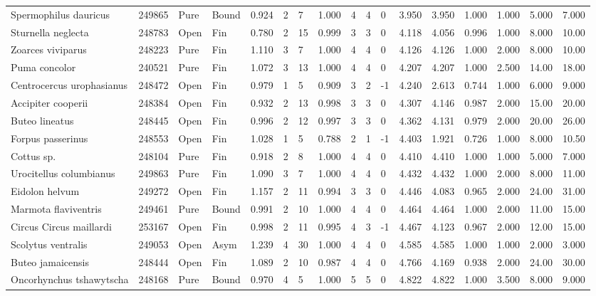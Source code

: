 \documentclass[10pt,a4paper]{amsart}
\theoremstyle{definition}
\theoremstyle{remark}
\numberwithin{equation}{section}
\begin{document}
\begin{table}[ht]
{\begin{tabular}{lllllllllllllllll}
Spermophilus dauricus & 249865 & Pure & Bound & 0.924 & 2 & 7 & 1.000 & 4 & 4 & 0 & 3.950 & 3.950 & 1.000 & 1.000 & 5.000 & 7.000 \\
Sturnella neglecta & 248783 & Open & Fin & 0.780 & 2 & 15 & 0.999 & 3 & 3 & 0 & 4.118 & 4.056 & 0.996 & 1.000 & 8.000 & 10.00 \\
Zoarces viviparus & 248223 & Pure & Fin & 1.110 & 3 & 7 & 1.000 & 4 & 4 & 0 & 4.126 & 4.126 & 1.000 & 2.000 & 8.000 & 10.00 \\
Puma concolor & 240521 & Pure & Fin & 1.072 & 3 & 13 & 1.000 & 4 & 4 & 0 & 4.207 & 4.207 & 1.000 & 2.500 & 14.00 & 18.00 \\
Centrocercus urophasianus & 248472 & Open & Fin & 0.979 & 1 & 5 & 0.909 & 3 & 2 & -1 & 4.240 & 2.613 & 0.744 & 1.000 & 6.000 & 9.000 \\
Accipiter cooperii & 248384 & Open & Fin & 0.932 & 2 & 13 & 0.998 & 3 & 3 & 0 & 4.307 & 4.146 & 0.987 & 2.000 & 15.00 & 20.00 \\
Buteo lineatus & 248445 & Open & Fin & 0.996 & 2 & 12 & 0.997 & 3 & 3 & 0 & 4.362 & 4.131 & 0.979 & 2.000 & 20.00 & 26.00 \\
Forpus passerinus & 248553 & Open & Fin & 1.028 & 1 & 5 & 0.788 & 2 & 1 & -1 & 4.403 & 1.921 & 0.726 & 1.000 & 8.000 & 10.50 \\
Cottus sp. & 248104 & Pure & Fin & 0.918 & 2 & 8 & 1.000 & 4 & 4 & 0 & 4.410 & 4.410 & 1.000 & 1.000 & 5.000 & 7.000 \\
Urocitellus columbianus & 249863 & Pure & Fin & 1.090 & 3 & 7 & 1.000 & 4 & 4 & 0 & 4.432 & 4.432 & 1.000 & 2.000 & 8.000 & 11.00 \\
Eidolon helvum & 249272 & Open & Fin & 1.157 & 2 & 11 & 0.994 & 3 & 3 & 0 & 4.446 & 4.083 & 0.965 & 2.000 & 24.00 & 31.00 \\
Marmota flaviventris & 249461 & Pure & Bound & 0.991 & 2 & 10 & 1.000 & 4 & 4 & 0 & 4.464 & 4.464 & 1.000 & 2.000 & 11.00 & 15.00 \\
Circus Circus maillardi & 253167 & Open & Fin & 0.998 & 2 & 11 & 0.995 & 4 & 3 & -1 & 4.467 & 4.123 & 0.967 & 2.000 & 12.00 & 15.00 \\
Scolytus ventralis & 249053 & Open & Asym & 1.239 & 4 & 30 & 1.000 & 4 & 4 & 0 & 4.585 & 4.585 & 1.000 & 1.000 & 2.000 & 3.000 \\
Buteo jamaicensis & 248444 & Open & Fin & 1.089 & 2 & 10 & 0.987 & 4 & 4 & 0 & 4.766 & 4.169 & 0.938 & 2.000 & 24.00 & 30.00 \\
Oncorhynchus tshawytscha & 248168 & Pure & Bound & 0.970 & 4 & 5 & 1.000 & 5 & 5 & 0 & 4.822 & 4.822 & 1.000 & 3.500 & 8.000 & 9.000 \\

\end{tabular}}
\end{table}
\end{document}
